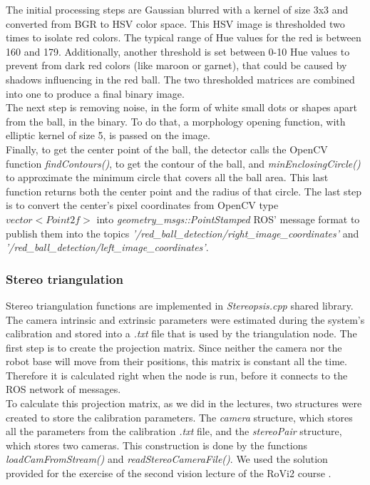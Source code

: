 The initial processing steps are Gaussian blurred with a kernel of size 3x3 and converted from BGR to HSV color space. This HSV image is thresholded two times to isolate red colors. The typical range of Hue values for the red is between 160 and 179. Additionally, another threshold is set between 0-10 Hue values to prevent from dark red colors (like maroon or garnet), that could be caused by shadows influencing in the red ball. The two thresholded matrices are combined into one to produce a final binary image.\\ 

The next step is removing noise, in the form of white small dots or shapes apart from the ball, in the binary. To do that, a morphology opening function, with elliptic kernel of size 5, is passed on the image. \\

Finally, to get the center point of the ball, the detector calls the OpenCV function \textit{findContours()}, to get the contour of the ball, and \textit{minEnclosingCircle()} to approximate the minimum circle that covers all the ball area. This last function returns both the center point and the radius of that circle. The last step is to convert the center's pixel coordinates from OpenCV type \textit{$vector<Point2f>$} into \textit{geometry\_msgs::PointStamped}  ROS'  message format to publish them into the topics \textit{'/red\_ball\_detection/right\_image\_coordinates'} and \textit{'/red\_ball\_detection/left\_image\_coordinates'}. \\

\subsubsection{Stereo triangulation}

Stereo triangulation functions are implemented in \textit{Stereopsis.cpp} shared library. The camera intrinsic and extrinsic parameters were estimated during the system's calibration and stored into a \textit{.txt} file that is used by the triangulation node. The first step is to create the projection matrix. Since neither the camera nor the robot base will move from their positions, this matrix is constant all the time. Therefore it is calculated right when the node is run, before it connects to the ROS network of messages. \\

To calculate this projection matrix, as we did in the lectures, two structures were created to store the calibration parameters. The \textit{camera} structure, which stores all the parameters from the calibration \textit{.txt} file, and the \textit{stereoPair} structure, which stores two cameras. This construction is done by the functions \textit{loadCamFromStream()} and \textit{readStereoCameraFile()}. We used the solution provided for the exercise of the second vision lecture of the RoVi2 course \cite{stereopsisExerciseSolution}. \\

